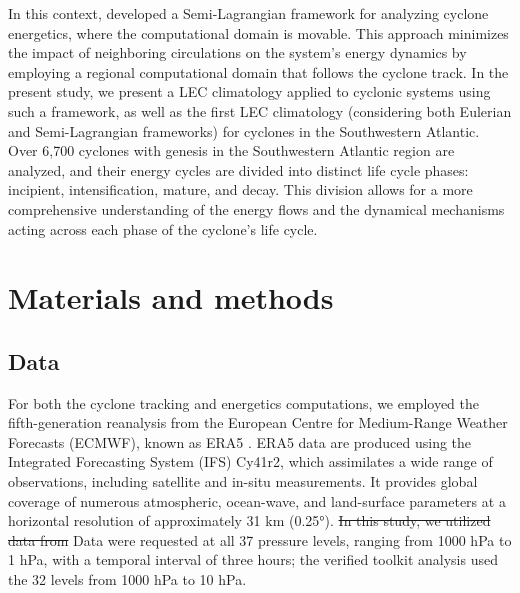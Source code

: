 \documentclass[pdflatex,sn-chicago]{sn-jnl}%
\makeatletter
\theoremstyle{plain}
\theoremstyle{definition}
\theoremstyle{remark}
\theoremstyle{definition}
\providecommand{\DIFaddtex}[1]{{\protect\color{blue}#1}} %
\providecommand{\DIFdeltex}[1]{{\protect\color{red}\sout{#1}}} %
\providecommand{\DIFaddbegin}{} %
\providecommand{\DIFaddend}{} %
\providecommand{\DIFdelbegin}{} %
\providecommand{\DIFdelend}{} %
\providecommand{\DIFadd}[1]{\texorpdfstring{\DIFaddtex{#1}}{#1}} %
\providecommand{\DIFdel}[1]{\texorpdfstring{\DIFdeltex{#1}}{}} %
\let\sout@orig\sout %
\renewcommand{\sout}[1]{\ifmmode\text{\sout@orig{\ensuremath{#1}}}\else\sout@orig{#1}\fi} %
\makeatother
\begin{document}
In this context, \citet{michaelides1999quasi} developed a Semi-Lagrangian framework for analyzing cyclone energetics, where the computational domain is movable. This approach minimizes the impact of neighboring circulations on the system's energy dynamics by employing a regional computational domain that follows the cyclone track. In the present study, we present a LEC climatology applied to cyclonic systems using such a framework, as well as the first LEC climatology (considering both Eulerian and Semi-Lagrangian frameworks) for cyclones in the Southwestern Atlantic. Over 6,700 cyclones with genesis in the Southwestern Atlantic region are analyzed, and their energy cycles are divided into distinct life cycle phases: incipient, intensification, mature, and decay. This division allows for a more comprehensive understanding of the energy flows and the dynamical mechanisms acting across each phase of the cyclone's life cycle.

\section{Materials and methods}

\subsection{Data}\label{sec:data}

For both the cyclone tracking and energetics computations, we employed the fifth-generation reanalysis from the European Centre for Medium-Range Weather Forecasts (ECMWF), known as ERA5 \citep{hersbach2020era5}. ERA5 data are produced using the Integrated Forecasting System (IFS) Cy41r2, which assimilates a wide range of observations, including satellite and in-situ measurements. It provides global coverage of numerous atmospheric, ocean-wave, and land-surface parameters at a horizontal resolution of approximately 31 km (0.25°). \DIFdelbegin \DIFdel{In this study, we utilized data from }\DIFdelend \DIFaddbegin \DIFadd{Data were requested at }\DIFaddend all 37 pressure levels, ranging from 1000 hPa to 1 hPa, with a temporal interval of three hours\DIFaddbegin \DIFadd{; the verified toolkit analysis used the 32 levels from 1000 hPa to 10 hPa}\DIFaddend .
\end{document}
